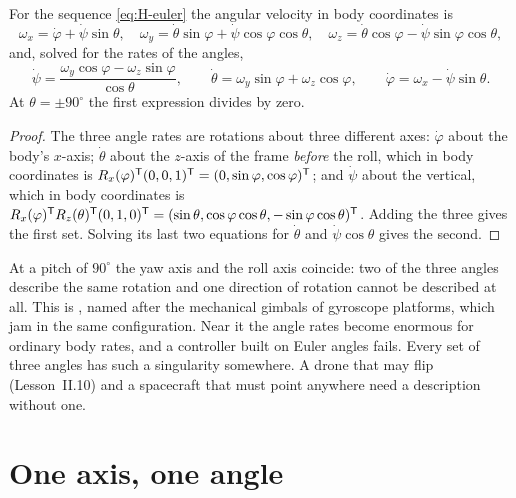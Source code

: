 \begin{theorem}
\label{thm:H-gimbal}
For the sequence \eqref{eq:H-euler} the angular velocity in body coordinates is
\begin{equation*}
  \omega_x = \dot\varphi + \dot\psi\sin\theta, \quad
  \omega_y = \dot\theta\sin\varphi + \dot\psi\cos\varphi\cos\theta, \quad
  \omega_z = \dot\theta\cos\varphi - \dot\psi\sin\varphi\cos\theta ,
\end{equation*}
and, solved for the rates of the angles,
\begin{equation*}
  \dot\psi = \frac{\omega_y\cos\varphi - \omega_z\sin\varphi}{\cos\theta}, \qquad
  \dot\theta = \omega_y\sin\varphi + \omega_z\cos\varphi, \qquad
  \dot\varphi = \omega_x - \dot\psi\sin\theta .
\end{equation*}
At $\theta = \pm90^\circ$ the first expression divides by zero.
\end{theorem}
\begin{proof}
The three angle rates are rotations about three different axes: $\dot\varphi$ about the body's $x$-axis; $\dot\theta$ about the $z$-axis of the frame \emph{before} the roll, which in body coordinates is $R_x(\varphi)^{\mathsf{T}}(0, 0, 1)^{\mathsf{T}} = (0, \sin\varphi, \cos\varphi)^{\mathsf{T}}$; and $\dot\psi$ about the vertical, which in body coordinates is $R_x(\varphi)^{\mathsf{T}} R_z(\theta)^{\mathsf{T}}(0, 1, 0)^{\mathsf{T}} = (\sin\theta, \cos\varphi\cos\theta, -\sin\varphi\cos\theta)^{\mathsf{T}}$. Adding the three gives the first set. Solving its last two equations for $\dot\theta$ and $\dot\psi\cos\theta$ gives the second.
\end{proof}

At a pitch of $90^\circ$ the yaw axis and the roll axis coincide: two of the three angles describe the same rotation and one direction of rotation cannot be described at all. This is , named after the mechanical gimbals of gyroscope platforms, which jam in the same configuration. Near it the angle rates become enormous for ordinary body rates, and a controller built on Euler angles fails. Every set of three angles has such a singularity somewhere. A drone that may flip (Lesson~II.10) and a spacecraft that must point anywhere need a description without one.

\section{One axis, one angle}

